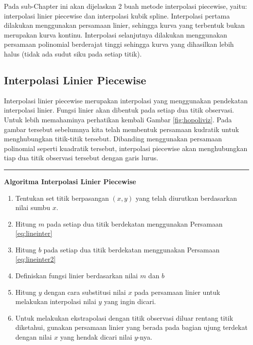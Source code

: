 \documentclass[
]{book}
\providecommand{\tightlist}{%
  \setlength{\itemsep}{0pt}\setlength{\parskip}{0pt}}
\theoremstyle{definition}
\theoremstyle{definition}
\theoremstyle{definition}
\theoremstyle{definition}
\theoremstyle{remark}
\begin{document}
Pada sub-Chapter ini akan dijelaskan 2 buah metode interpolasi piecewise, yaitu: interpolasi linier piecewise dan interpolasi kubik spline. Interpolasi pertama dilakukan menggunakan persamaan linier, sehingga kurva yang terbentuk bukan merupakan kurva kontinu. Interpolasi selanjutnya dilakukan menggunakan persamaan polinomial berderajat tinggi sehingga kurva yang dihasilkan lebih halus (tidak ada sudut siku pada setiap titik).

\hypertarget{pwlininter}{%
\subsection{Interpolasi Linier Piecewise}\label{pwlininter}}

Interpolasi linier piecewise merupakan interpolasi yang menggunakan pendekatan interpolasi linier. Fungsi linier akan dibentuk pada setiap dua titik observasi. Untuk lebih memahaminya perhatikan kembali Gambar \ref{fig:hopoliviz}. Pada gambar tersebut sebelumnya kita telah membentuk persamaan kudratik untuk menghubungkan titik-titik tersebut. Dibanding menggunakan persamaan polinomial seperti kuadratik tersebut, interpolasi piecewise akan menghubungkan tiap dua titik observasi tersebut dengan garis lurus.

\begin{center}\rule{0.5\linewidth}{0.5pt}\end{center}

\textbf{Algoritma Interpolasi Linier Piecewise}

\begin{enumerate}
\def\labelenumi{\arabic{enumi}.}
\tightlist
\item
  Tentukan set titik berpasangan \(\left(x,y\right)\) yang telah diurutkan berdasarkan nilai sumbu \(x\).
\item
  Hitung \(m\) pada setiap dua titik berdekatan menggunakan Persamaan \eqref{eq:lineinter}
\item
  Hitung \(b\) pada setiap dua titik berdekatan menggunakan Persamaan \eqref{eq:lineinter2}
\item
  Definiskan fungsi linier berdasarkan nilai \(m\) dan \(b\)
\item
  Hitung \(y\) dengan cara substitusi nilai \(x\) pada persamaan linier untuk melakukan interpolasi nilai \(y\) yang ingin dicari.
\item
  Untuk melakukan ekstrapolasi dengan titik observasi diluar rentang titik diketahui, gunakan persamaan linier yang berada pada bagian ujung terdekat dengan nilai \(x\) yang hendak dicari nilai \(y\)-nya.
\end{enumerate}
\end{document}
